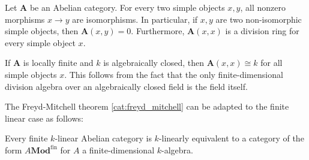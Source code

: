 
    \begin{theorem}\label{cat:schur_lemma}
        Let $\mathbf{A}$ be an Abelian category. For every two simple objects $x,y$, all nonzero morphisms $x\rightarrow y$ are isomorphisms. In particular, if $x,y$ are two non-isomorphic simple objects, then $\mathbf{A}(x,y)=0$. Furthermore, $\mathbf{A}(x,x)$ is a division ring for every simple object $x$.
    \end{theorem}
    \begin{result}
        If $\mathbf{A}$ is locally finite and $k$ is algebraically closed, then $\mathbf{A}(x,x)\cong k$ for all simple objects $x$. This follows from the fact that the only finite-dimensional division algebra over an algebraically closed field is the field itself.
    \end{result}

    The Freyd-Mitchell theorem \ref{cat:freyd_mitchell} can be adapted to the finite linear case as follows:
    \begin{theorem}[Deligne]
        Every finite $k$-linear Abelian category is $k$-linearly equivalent to a category of the form $A\mathbf{Mod}^\mathrm{fin}$ for $A$ a finite-dimensional $k$-algebra.
    \end{theorem}

